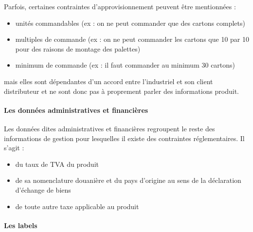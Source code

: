                 Parfois, certaines contraintes d'approvisionnement peuvent être mentionnées : 
                \begin{itemize}
                    \item unités commandables (ex : on ne peut commander que des cartons complets)
                    \item multiples de commande (ex : on ne peut commander les cartons que 10 par 10 pour des raisons de montage des palettes)
                    \item minimum de commande (ex : il faut commander au minimum 30 cartons)
                \end{itemize}
                mais elles sont dépendantes d'un accord entre l'industriel et son client distributeur et ne sont donc pas à proprement parler des informations produit.

                \paragraph{Les données administratives et financières}

                Les données dites administratives et financières regroupent le reste des informations de gestion pour lesquelles il existe des contraintes réglementaires.
                Il s'agit :
                \begin{itemize}
                    \item du taux de TVA du produit
                    \item de sa nomenclature douanière et du pays d'origine au sens de la déclaration d'échange de biens\cite{notions_DEB}
                    \item de toute autre taxe applicable au produit
                \end{itemize}

                \paragraph{Les labels} 
                \label{labels}

